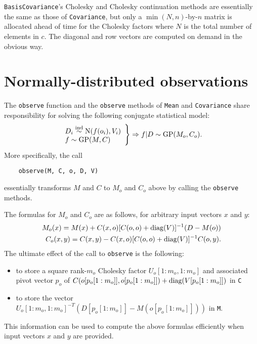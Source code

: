 \documentclass{report}
\begin{document}
\texttt{BasisCovariance}'s Cholesky and Cholesky continuation methods are essentially the same as those of \texttt{Covariance}, but only a $\min (N,n)$-by-$n$ matrix is allocated ahead of time for the Cholesky factors where $N$ is the total number of elements in $c$. The diagonal and row vectors are computed on demand in the obvious way.

\section{Normally-distributed observations}\label{sec:obs}

The \texttt{observe} function and the \texttt{observe} methods of \texttt{Mean} and \texttt{Covariance} share responsibility for solving the following conjugate statistical model:
\begin{equation}
    \label{regprior}
    \left.\begin{array}{l}
        D_i \stackrel{\tiny{\textup{ind}}}{\sim} \textup{N}(f(o_i), V_i)\\
        f \sim \textup{GP}(M,C)\\
    \end{array}\right\}\Rightarrow f|D \sim \textup{GP}(M_o, C_o).
\end{equation}
More specifically, the call
\begin{verbatim}
    observe(M, C, o, D, V)
\end{verbatim}
essentially transforms $M$ and $C$ to $M_o$ and $C_o$ above by calling the \texttt{observe} methods.

The formulas for $M_o$ and $C_o$ are as follows, for arbitrary input vectors $x$ and $y$:
\begin{eqnarray*}
    M_o(x) = M(x) + C(x,o)[C(o,o) + \textup{diag}(V)]^{-1}(D-M(o))\\
    C_o(x,y) = C(x,y) - C(x,o)[C(o,o) + \textup{diag}(V)]^{-1}C(o,y).
\end{eqnarray*}
The ultimate effect of the call to \texttt{observe} is the following:
\begin{itemize}
    \item to store a square rank-$m_o$ Cholesky factor $U_o[1:m_o,1:m_o]$ and associated pivot vector $p_o$ of $C(o[p_o[1:m_o]],o[p_o[1:m_o]]) + \textup{diag}(V[p_o[1:m_o]])$ in \texttt{C}
    \item to store the vector $U_o[1:m_o,1:m_o]^{-T}(D[p_o[1:m_o]] - M(o[p_o[1:m_o]]))$ in \texttt{M}.
\end{itemize}
This information can be used to compute the above formulas efficiently when input vectors $x$ and $y$ are provided.
\end{document}
